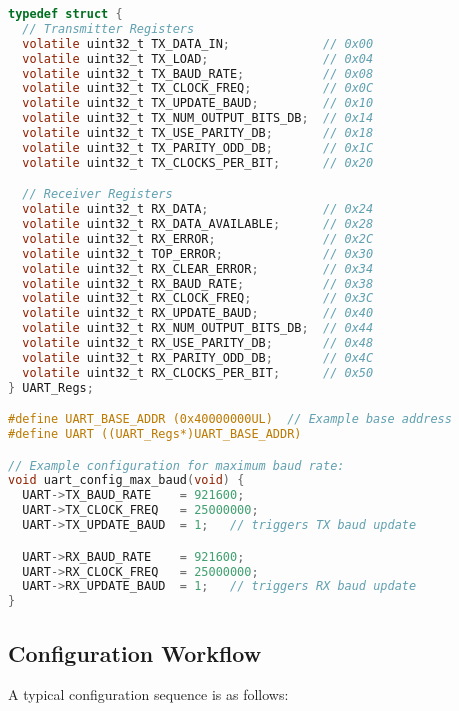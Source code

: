 \begin{lstlisting}[language=C,frame=single]
typedef struct {
  // Transmitter Registers
  volatile uint32_t TX_DATA_IN;             // 0x00
  volatile uint32_t TX_LOAD;                // 0x04
  volatile uint32_t TX_BAUD_RATE;           // 0x08
  volatile uint32_t TX_CLOCK_FREQ;          // 0x0C
  volatile uint32_t TX_UPDATE_BAUD;         // 0x10
  volatile uint32_t TX_NUM_OUTPUT_BITS_DB;  // 0x14
  volatile uint32_t TX_USE_PARITY_DB;       // 0x18
  volatile uint32_t TX_PARITY_ODD_DB;       // 0x1C
  volatile uint32_t TX_CLOCKS_PER_BIT;      // 0x20

  // Receiver Registers
  volatile uint32_t RX_DATA;                // 0x24
  volatile uint32_t RX_DATA_AVAILABLE;      // 0x28
  volatile uint32_t RX_ERROR;               // 0x2C
  volatile uint32_t TOP_ERROR;              // 0x30
  volatile uint32_t RX_CLEAR_ERROR;         // 0x34
  volatile uint32_t RX_BAUD_RATE;           // 0x38
  volatile uint32_t RX_CLOCK_FREQ;          // 0x3C
  volatile uint32_t RX_UPDATE_BAUD;         // 0x40
  volatile uint32_t RX_NUM_OUTPUT_BITS_DB;  // 0x44
  volatile uint32_t RX_USE_PARITY_DB;       // 0x48
  volatile uint32_t RX_PARITY_ODD_DB;       // 0x4C
  volatile uint32_t RX_CLOCKS_PER_BIT;      // 0x50
} UART_Regs;

#define UART_BASE_ADDR (0x40000000UL)  // Example base address
#define UART ((UART_Regs*)UART_BASE_ADDR)

// Example configuration for maximum baud rate:
void uart_config_max_baud(void) {
  UART->TX_BAUD_RATE    = 921600;
  UART->TX_CLOCK_FREQ   = 25000000;
  UART->TX_UPDATE_BAUD  = 1;   // triggers TX baud update

  UART->RX_BAUD_RATE    = 921600;
  UART->RX_CLOCK_FREQ   = 25000000;
  UART->RX_UPDATE_BAUD  = 1;   // triggers RX baud update
}
\end{lstlisting}

\subsection{Configuration Workflow}

A typical configuration sequence is as follows:

